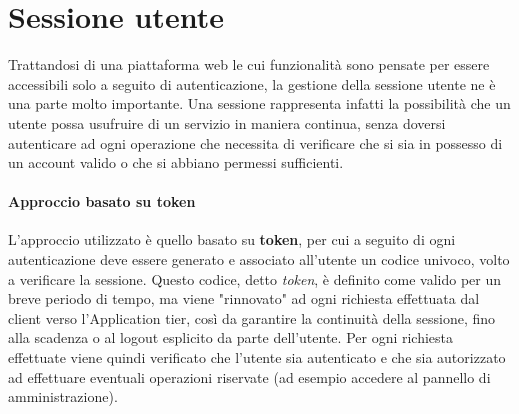 \section{Sessione utente}
Trattandosi di una piattaforma web le cui funzionalità sono pensate per essere
accessibili solo a seguito di autenticazione, la gestione della sessione utente
ne è una parte molto importante. Una sessione rappresenta infatti la possibilità
che un utente possa usufruire di un servizio in maniera continua, senza doversi
autenticare ad ogni operazione che necessita di verificare che si sia in possesso
di un account valido o che si abbiano permessi sufficienti.

\paragraph{Approccio basato su token}
L'approccio utilizzato è quello basato su \textbf{token}, per cui a seguito
di ogni autenticazione deve essere generato e associato all'utente un codice
univoco, volto a verificare la sessione. Questo codice, detto \textit{token}, è
definito come valido per un breve periodo di tempo, ma viene "rinnovato" ad ogni
richiesta effettuata dal client verso l'Application tier, così da garantire la
continuità della sessione, fino alla scadenza o al logout esplicito da parte
dell'utente.
Per ogni richiesta effettuate viene quindi verificato che l'utente sia autenticato
e che sia autorizzato ad effettuare eventuali operazioni riservate (ad esempio
accedere al pannello di amministrazione).
